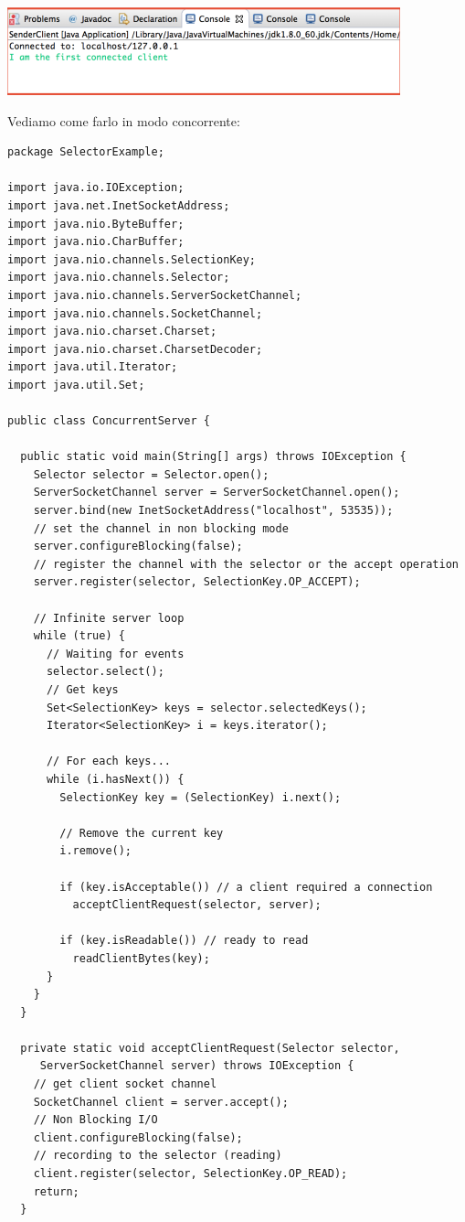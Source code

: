 \message{ !name(sd.tex)}\documentclass[a4paper,12pt, oneside]{book}
\begin{document}
\begin{center}
	\includegraphics[scale=0.7]{img/conc4.png}
\end{center}
Vediamo come farlo in modo concorrente:
\begin{verbatim}
package SelectorExample;

import java.io.IOException;
import java.net.InetSocketAddress;
import java.nio.ByteBuffer;
import java.nio.CharBuffer;
import java.nio.channels.SelectionKey;
import java.nio.channels.Selector;
import java.nio.channels.ServerSocketChannel;
import java.nio.channels.SocketChannel;
import java.nio.charset.Charset;
import java.nio.charset.CharsetDecoder;
import java.util.Iterator;
import java.util.Set;

public class ConcurrentServer {

  public static void main(String[] args) throws IOException {
    Selector selector = Selector.open();
    ServerSocketChannel server = ServerSocketChannel.open();
    server.bind(new InetSocketAddress("localhost", 53535));
    // set the channel in non blocking mode
    server.configureBlocking(false);
    // register the channel with the selector or the accept operation
    server.register(selector, SelectionKey.OP_ACCEPT);

    // Infinite server loop
    while (true) {
      // Waiting for events
      selector.select();
      // Get keys
      Set<SelectionKey> keys = selector.selectedKeys();
      Iterator<SelectionKey> i = keys.iterator();

      // For each keys...
      while (i.hasNext()) {
        SelectionKey key = (SelectionKey) i.next();

        // Remove the current key
        i.remove();

        if (key.isAcceptable()) // a client required a connection
          acceptClientRequest(selector, server);

        if (key.isReadable()) // ready to read
          readClientBytes(key);
      }
    }
  }

  private static void acceptClientRequest(Selector selector,
     ServerSocketChannel server) throws IOException {
    // get client socket channel
    SocketChannel client = server.accept();
    // Non Blocking I/O
    client.configureBlocking(false);
    // recording to the selector (reading)
    client.register(selector, SelectionKey.OP_READ);
    return;
  }


\end{verbatim}
\end{document}
